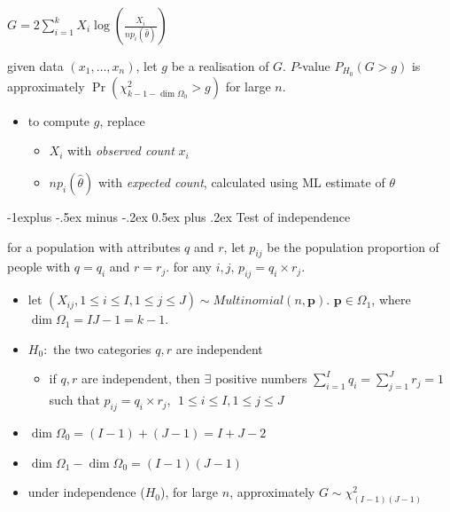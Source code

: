 \documentclass[10pt, landscape]{article}
\makeatletter
\renewcommand{\subsection}{\@startsection{subsection}{2}{0mm}%
  {-1explus -.5ex minus -.2ex}%
  {0.5ex plus .2ex}%
{\normalfont\normalsize\bfseries}}
\newcommand{\seq}[2][n]{#2_1, \dots, #2_{#1}}
\makeatother
\begin{document}
\begin{multicols*}{4}
  \begin{tightcenter}
    $G = 2\sum^k_{i=1} X_i \log \left( \frac{X_i}{np_i(\hat\theta)} \right)$
  \end{tightcenter}

  given data $(\seq x)$, let $g$ be a realisation of $G$. 
  $P$-value $P_{H_0} (G > g)$ is approximately $\Pr (\chi^2_{k-1-\dim\Omega_0} > g)$ for large $n$.

  \begin{itemize}
    \item to compute $g$, replace
      \begin{itemize}
        \item $X_i$ with \textit{observed count} $x_i$
        \item $np_i(\hat\theta)$ with \textit{expected count}, calculated using ML estimate of  $\theta$
      \end{itemize}
  \end{itemize}

  \subsection{Test of independence}

  for a population with attributes $q$ and $r$, 
  let $p_{ij}$ be the population proportion of people with $q=q_i$ and $r=r_j$.
  for any $i, j$, $p_{ij} = q_i \times r_j$.

  \begin{itemize}
    \item let $(X_{ij}, 1 \leq i \leq I, 1 \leq j \leq J) \sim Multinomial(n, \mathbf{p})$.
      $\mathbf{p} \in \Omega_1$, where $\dim \Omega_1 = IJ - 1 = k-1$.
    \item $H_0 : $ the two categories $q,r$ are independent
      \begin{itemize}
        \item if $q,r$ are independent, then $\exists $ positive numbers $\sum^I_{i=1}q_i = \sum^J_{j=1}r_j = 1$
          such that $p_{ij} = q_i \times r_j$, $\; 1 \leq i \leq I, 1 \leq j \leq J$
      \end{itemize}
    \item $\dim\Omega_0 = (I-1) + (J-1) = I+J-2$
    \item $\dim\Omega_1 - \dim\Omega_0 = (I-1)(J-1)$
    \item under independence ($H_0$), for large  $n$, approximately $G \sim \chi^2_{(I-1)(J-1)}$
  \end{itemize}


\end{multicols*}
\end{document}
